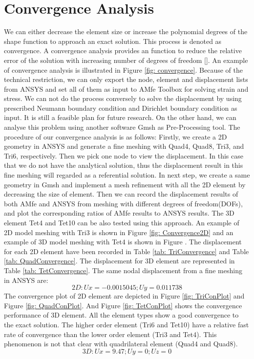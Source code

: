 \section{Convergence Analysis}
We can either decrease the element size or increase the polynomial degrees of the shape function to approach an exact solution. This process is denoted as convergence. A convergence analysis provides an function to reduce the relative error of the solution with increasing number of degrees of freedom [\cite{FiniteElement}]. An example of convergence analysis is illustrated in Figure \ref{fig: convergence}. Because of the technical restriction, we can only export the node, element and displacement lists from ANSYS and set all of them as input to AMfe Toolbox for solving strain and stress. We can not do the process conversely to solve the displacement by using prescribed Neumann boundary condition and Dirichlet boundary condition as input. It is still a feasible plan for future research. On the other hand, we can analyse this problem using another software Gmsh as Pre-Processing tool. The procedure of our convergence analysis is as follows: Firstly, we create a 2D geometry in ANSYS and generate a fine meshing with Quad4, Quad8, Tri3, and Tri6, respectively. Then we pick one node to view the displacement. In this case that we do not have the analytical solution, thus the displacement result in this fine meshing will regarded as a referential solution. In next step, we create a same geometry in Gmsh and implement a mesh refinement with all the 2D element by decreasing the size of element. Then we can record the displacement results of both AMfe and ANSYS from meshing with different degrees of freedom(DOFs), and plot the corresponding ratios of AMfe results to ANSYS results. The 3D element Tet4 and Tet10 can be also tested using this approach. An example of 2D model meshing with Tri3 is shown in Figure \ref{fig: Convergence2D} and an example of 3D model meshing with Tet4 is shown in Figure . The displacement for each 2D element have been recorded in Table \ref{tab: TriConvergence} and Table \ref{tab: QuadConvergence}. The displacement for 3D element are represented in Table \ref{tab: TetConvergence}. The same nodal displacement from a fine meshing in ANSYS are:
\begin{equation*}
2D: Ux = -0.0015045; Uy = 0.011738
\end{equation*}
The convergence plot of 2D element are depicted in Figure \ref{fig: TriConPlot} and Figure \ref{fig: QuadConPlot}. And Figure \ref{fig: TetConPlot} shows the convergence performance of 3D element. All the element types show a good convergence to the exact solution. The higher order element (Tri6 and Tet10) have a relative fast rate of convergence than the lower order element (Tri3 and Tet4). This phenomenon is not that clear with quadrilateral element (Quad4 and Quad8). 
\begin{equation*}
3D: Ux = 9.47; Uy = 0; Uz = 0
\end{equation*}

